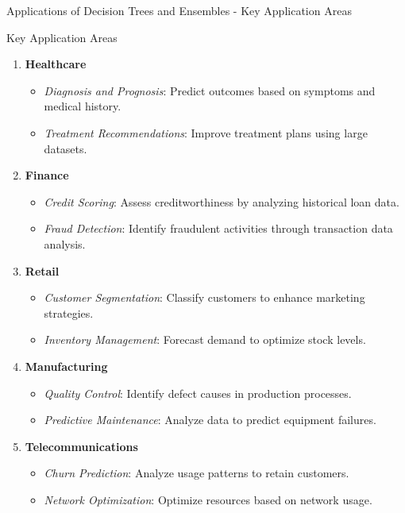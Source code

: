 \documentclass[aspectratio=169]{beamer}
\begin{document}
\begin{frame}[fragile]{Applications of Decision Trees and Ensembles - Key Application Areas}
    \begin{block}{Key Application Areas}
        \begin{enumerate}
            \item \textbf{Healthcare}
                \begin{itemize}
                    \item \textit{Diagnosis and Prognosis}: Predict outcomes based on symptoms and medical history.
                    \item \textit{Treatment Recommendations}: Improve treatment plans using large datasets.
                \end{itemize}
            \item \textbf{Finance}
                \begin{itemize}
                    \item \textit{Credit Scoring}: Assess creditworthiness by analyzing historical loan data.
                    \item \textit{Fraud Detection}: Identify fraudulent activities through transaction data analysis.
                \end{itemize}
            \item \textbf{Retail}
                \begin{itemize}
                    \item \textit{Customer Segmentation}: Classify customers to enhance marketing strategies.
                    \item \textit{Inventory Management}: Forecast demand to optimize stock levels.
                \end{itemize}
            \item \textbf{Manufacturing}
                \begin{itemize}
                    \item \textit{Quality Control}: Identify defect causes in production processes.
                    \item \textit{Predictive Maintenance}: Analyze data to predict equipment failures.
                \end{itemize}
            \item \textbf{Telecommunications}
                \begin{itemize}
                    \item \textit{Churn Prediction}: Analyze usage patterns to retain customers.
                    \item \textit{Network Optimization}: Optimize resources based on network usage.
                \end{itemize}
        \end{enumerate}
    \end{block}
\end{frame}
\end{document}
